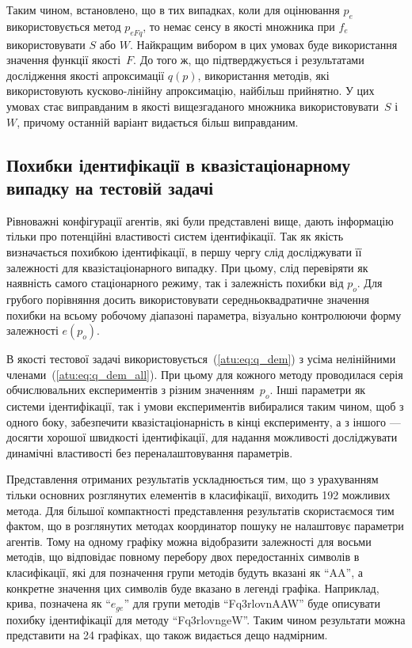Таким чином, встановлено, що в тих випадках, коли для оцінювання $p_e$ використовується
метод $p_{eFq}$, то немає сенсу в якості множника при $f_e$
використовувати $S$ або $W$. Найкращим вибором в цих умовах буде
використання значення функції якості~$F$. До того ж, що підтверджується і
результатами дослідження якості апроксимації $q(p)$, використання методів,
які використовують кусково-лінійну апроксимацію, найбільш прийнятно. У цих
умовах стає виправданим в якості вищезгаданого множника використовувати~$S$
і~$W$, причому останній варіант видається більш виправданим.


\subsection{Похибки ідентифікації в квазістаціонарному випадку на тестовій задачі} %

Рівноважні конфігурації агентів, які були представлені вище, дають інформацію тільки про
потенційні властивості систем ідентифікації.
Так як якість визначається похибкою ідентифікації,
в першу чергу слід досліджувати її залежності для
квазістаціонарного випадку.
При цьому, слід перевіряти як наявність самого стаціонарного
режиму, так і залежність похибки від
$ p_o $. Для грубого порівняння досить використовувати
середньоквадратичне значення похибки на всьому робочому
діапазоні параметра, візуально контролюючи форму залежності
$ e (p_o) $.

В якості тестової задачі
використовується~(\ref{atu:eq:q_dem}) з усіма нелінійними членами~(\ref{atu:eq:q_dem_all}).
При цьому для кожного методу
проводилася серія обчислювальних експериментів з різним значенням~$p_o$. Інші
параметри як системи ідентифікації, так і умови експериментів вибиралися таким
чином, щоб з одного боку, забезпечити квазістаціонарність в кінці експерименту, а
з іншого --- досягти хорошої швидкості ідентифікації, для надання можливості
досліджувати динамічні властивості без переналаштовування параметрів.

Представлення отриманих результатів ускладнюється тим, що з урахуванням тільки
основних розглянутих елементів в класифікації, виходить 192 можливих метода.
Для більшої компактності представлення результатів
скористаємося тим фактом, що в розглянутих методах координатор
пошуку не налаштовує параметри агентів.
Тому на одному графіку можна відобразити залежності для восьми методів,
що відповідає повному перебору двох передостанніх символів в
класифікації, які для позначення групи методів будуть вказані як
``AA'', а конкретне значення цих символів буде вказано в легенді
графіка. Наприклад, крива, позначена як ``$e_{ge}$'' для групи
методів ``Fq3rlovnAAW'' буде описувати похибку ідентифікації для
методу ``Fq3rlovngeW''. Таким чином результати можна представити на
24 графіках, що також видається дещо надмірним.

